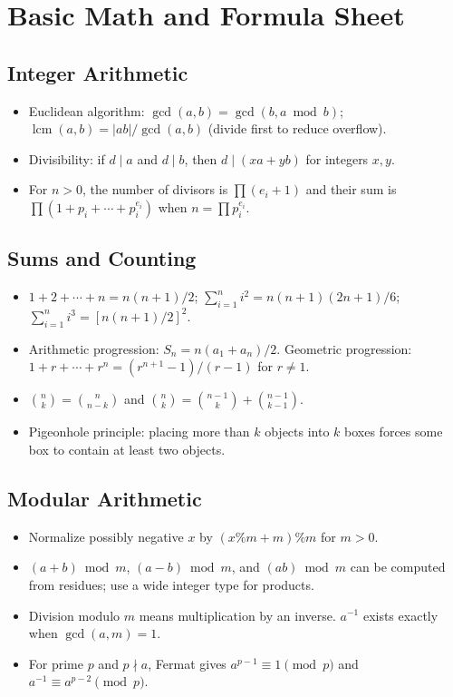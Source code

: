 \section{Basic Math and Formula Sheet}
\subsection{Integer Arithmetic}
\begin{itemize}
  \setlength{\itemsep}{0.2ex}
  \setlength{\topsep}{0.3ex}
  \setlength{\parsep}{0pt}
  \setlength{\partopsep}{0pt}
  \item Euclidean algorithm: $\gcd(a,b)=\gcd(b,a\bmod b)$; $\operatorname{lcm}(a,b)=|ab|/\gcd(a,b)$ (divide first to reduce overflow).
  \item Divisibility: if $d\mid a$ and $d\mid b$, then $d\mid (xa+yb)$ for integers $x,y$.
  \item For $n>0$, the number of divisors is $\prod (e_i+1)$ and their sum is $\prod (1+p_i+\cdots+p_i^{e_i})$ when $n=\prod p_i^{e_i}$.
\end{itemize}
\subsection{Sums and Counting}
\begin{itemize}
  \setlength{\itemsep}{0.2ex}
  \setlength{\topsep}{0.3ex}
  \setlength{\parsep}{0pt}
  \setlength{\partopsep}{0pt}
  \item $1+2+\cdots+n=n(n+1)/2$; $\sum_{i=1}^n i^2=n(n+1)(2n+1)/6$; $\sum_{i=1}^n i^3=[n(n+1)/2]^2$.
  \item Arithmetic progression: $S_n=n(a_1+a_n)/2$. Geometric progression: $1+r+\cdots+r^n=(r^{n+1}-1)/(r-1)$ for $r\ne1$.
  \item $\binom nk=\binom n{n-k}$ and $\binom nk=\binom{n-1}k+\binom{n-1}{k-1}$.
  \item Pigeonhole principle: placing more than $k$ objects into $k$ boxes forces some box to contain at least two objects.
\end{itemize}
\subsection{Modular Arithmetic}
\begin{itemize}
  \setlength{\itemsep}{0.2ex}
  \setlength{\topsep}{0.3ex}
  \setlength{\parsep}{0pt}
  \setlength{\partopsep}{0pt}
  \item Normalize possibly negative $x$ by $(x\%m+m)\%m$ for $m>0$.
  \item $(a+b)\bmod m$, $(a-b)\bmod m$, and $(ab)\bmod m$ can be computed from residues; use a wide integer type for products.
  \item Division modulo $m$ means multiplication by an inverse. $a^{-1}$ exists exactly when $\gcd(a,m)=1$.
  \item For prime $p$ and $p\nmid a$, Fermat gives $a^{p-1}\equiv1\pmod p$ and $a^{-1}\equiv a^{p-2}\pmod p$.
\end{itemize}
